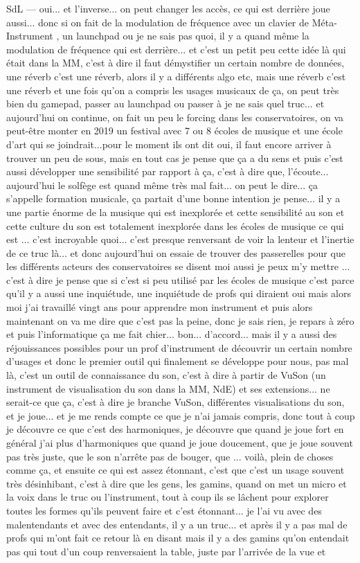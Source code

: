 SdL — oui... et l'inverse... on peut changer les accès, ce qui est derrière joue aussi... donc si on fait de la modulation de fréquence avec un clavier de Méta-Instrument , un launchpad ou je ne sais pas quoi, il y a quand même la modulation de fréquence qui est derrière... et c'est un petit peu cette idée là qui était dans la MM, c'est à dire il faut démystifier un certain nombre de données, une réverb c'est une réverb, alors il y a différents algo etc, mais une réverb c'est une réverb et une fois qu'on a compris les usages musicaux de ça, on peut très bien du gamepad, passer au launchpad ou passer à je ne sais quel truc... et aujourd'hui on continue, on fait un peu le forcing dans les conservatoires, on va peut-être monter en 2019 un festival avec 7 ou 8 écoles de musique et une école d'art qui se joindrait...pour le moment ils ont dit oui, il faut encore arriver à trouver un peu de sous, mais en tout cas je pense que ça a du sens et puis c'est aussi développer une sensibilité par rapport à ça, c'est à dire que, l'écoute... aujourd'hui le solfège est quand même très mal fait... on peut le dire... ça s'appelle formation musicale, ça partait d'une bonne intention je pense... il y a une partie énorme de la musique qui est inexplorée et cette sensibilité au son et cette culture du son est totalement inexplorée dans les écoles de musique ce qui est ... c'est incroyable quoi... c'est presque renversant de voir la lenteur et l'inertie de ce truc là... et donc aujourd'hui on essaie de trouver des passerelles pour que les différents acteurs des conservatoires se disent moi aussi je peux m'y mettre ... c'est à dire je pense que si c'est si peu utilisé par les écoles de musique c'est parce qu'il y a aussi une inquiétude, une inquiétude de profs qui diraient oui mais alors moi j'ai travaillé vingt ans pour apprendre mon instrument et puis alors maintenant on va me dire que c'est pas la peine, donc je sais rien, je repars à zéro et puis l'informatique ça me fait chier... bon... d'accord... mais il y a aussi des réjouissances possibles pour un prof d'instrument de découvrir un certain nombre d'usages et donc le premier outil qui finalement se développe pour nous, pas mal là, c'est un outil de connaissance du son, c'est à dire à partir de VuSon (un instrument de visualisation du son dans la MM, NdE) et ses extensions... ne serait-ce que ça, c'est à dire je branche VuSon, différentes visualisations du son, et je joue... et je me rends compte ce que je n'ai jamais compris, donc tout à coup je découvre ce que c'est des harmoniques, je découvre que quand je joue fort en général j'ai plus d'harmoniques que quand je joue doucement, que je joue souvent pas très juste, que le son n'arrête pas de bouger, que ... voilà, plein de choses comme ça, et ensuite ce qui est assez étonnant, c'est que c'est un usage souvent très désinhibant, c'est à dire que les gens, les gamins, quand on met un micro et la voix dans le truc ou l'instrument, tout à coup ils se lâchent pour explorer toutes les formes qu'ils peuvent faire et c'est étonnant... je l'ai vu avec des malentendants et avec des entendants, il y a un truc... et après il y a pas mal de profs qui m'ont fait ce retour là en disant mais il y a des gamins qu'on entendait pas qui tout d'un coup renversaient la table, juste par l'arrivée de la vue et 